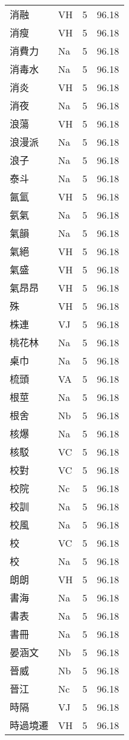 \documentclass[twocolumn]{book}
\begin{document}
\begin{supertabular}{llrr}
消融 & VH & 5 &  96.18\\
消瘦 & VH & 5 &  96.18\\
消費力 & Na & 5 &  96.18\\
消毒水 & Na & 5 &  96.18\\
消炎 & VH & 5 &  96.18\\
消夜 & Na & 5 &  96.18\\
浪蕩 & VH & 5 &  96.18\\
浪漫派 & Na & 5 &  96.18\\
浪子 & Na & 5 &  96.18\\
泰斗 & Na & 5 &  96.18\\
氤氳 & VH & 5 &  96.18\\
氨氣 & Na & 5 &  96.18\\
氣韻 & Na & 5 &  96.18\\
氣絕 & VH & 5 &  96.18\\
氣盛 & VH & 5 &  96.18\\
氣昂昂 & VH & 5 &  96.18\\
殊 & VH & 5 &  96.18\\
株連 & VJ & 5 &  96.18\\
桃花林 & Na & 5 &  96.18\\
桌巾 & Na & 5 &  96.18\\
梳頭 & VA & 5 &  96.18\\
根莖 & Na & 5 &  96.18\\
根舍 & Nb & 5 &  96.18\\
核爆 & Na & 5 &  96.18\\
核駁 & VC & 5 &  96.18\\
校對 & VC & 5 &  96.18\\
校院 & Nc & 5 &  96.18\\
校訓 & Na & 5 &  96.18\\
校風 & Na & 5 &  96.18\\
校 & VC & 5 &  96.18\\
校 & Na & 5 &  96.18\\
朗朗 & VH & 5 &  96.18\\
書海 & Na & 5 &  96.18\\
書表 & Na & 5 &  96.18\\
書冊 & Na & 5 &  96.18\\
晏涵文 & Nb & 5 &  96.18\\
晉威 & Nb & 5 &  96.18\\
晉江 & Nc & 5 &  96.18\\
時隔 & VJ & 5 &  96.18\\
時過境遷 & VH & 5 &  96.18\\

\end{supertabular}
\end{document}
